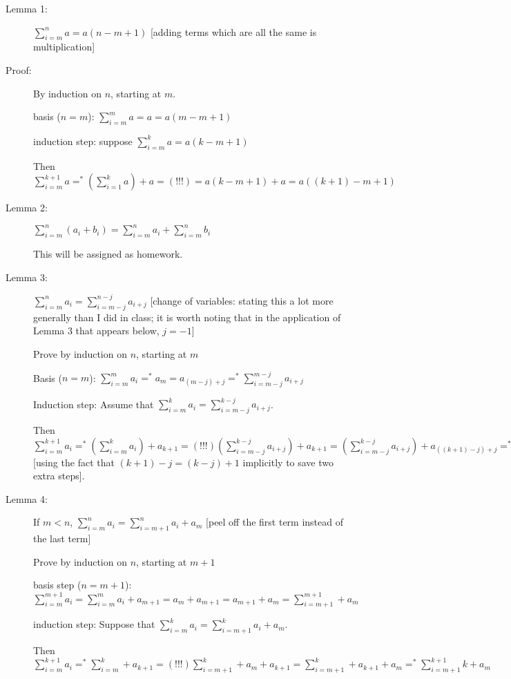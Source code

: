 \documentclass[12pt]{article}
\begin{document}
\begin{description}

\item[Lemma 1:] $\sum_{i=m}^n a = a(n-m+1)$  [adding terms which are all the same is multiplication]

\item[Proof:]  By induction on $n$, starting at $m$.

basis ($n=m$):  $\sum_{i=m}^m a = a = a(m-m+1)$

induction step:  suppose $\sum_{i=m}^{k}a = a(k-m+1)$

Then $\sum_{i=m}^{k+1} a =^* (\sum_{i=1}^k a) + a=(!!!)=a(k-m+1)+a = a((k+1)-m+1)$

\item[Lemma 2:]  $\sum_{i=m}^n (a_i + b_i) = \sum_{i=m}^n a_i + \sum_{i=m}^n b_i$

This will be assigned as homework.

\item[Lemma 3:]  $\sum_{i=m}^n a_i = \sum_{i=m-j}^{n-j} a_{i+j}$ [change of variables:  stating this a lot more generally than I did in class; it is worth noting that in the application of Lemma 3 that appears below, $j=-1$]

Prove by induction on $n$, starting at $m$

Basis ($n=m$):  $\sum_{i=m}^m a_i =^* a_m = a_{(m-j)+j} =^* \sum_{i=m-j}^{m-j} a_{i+j}$

Induction step:  Assume that $\sum_{i=m}^k a_i = \sum_{i=m-j}^{k-j} a_{i+j}$.

Then $\sum_{i=m}^{k+1} a_i =^* (\sum_{i=m}^k a_i)+a_{k+1}=(!!!) (\sum_{i=m-j}^{k-j} a_{i+j})+a_{k+1}=(\sum_{i=m-j}^{k-j} a_{i+j})+a_{((k+1)-j)+j}=^*\sum_{i=m-j}^{(k+1)-j} a_{i+j}$ [using the fact that $(k+1)-j = (k-j)+1$ implicitly to save two extra steps].

\item[Lemma 4:]  If $m<n$, $\sum_{i=m}^n a_i = \sum_{i=m+1}^n a_i + a_m$  [peel off the first term instead of the last term]

Prove by induction on $n$, starting at $m+1$

basis step ($n=m+1$):  $\sum_{i=m}^{m+1} a_i = \sum_{i=m}^m a_i + a_{m+1} = a_m + a_{m+1} = a_{m+1}+a_m = \sum_{i=m+1}^{m+1}+a_m$

induction step:  Suppose that $\sum_{i=m}^k a_i = \sum_{i=m+1}^k a_i + a_m$.

Then $\sum_{i=m}^{k+1} a_i =^* \sum_{i=m}^k + a_{k+1} =(!!!) \sum_{i=m+1}^k + a_m + a_{k+1} = \sum_{i=m+1}^k + a_{k+1} + a_m =^* \sum_{i=m+1}^{k+1}k + a_m $


\end{description}
\end{document}

